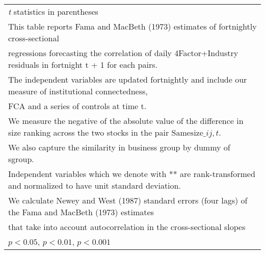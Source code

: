 {\begin{tabular}{l*{7}{c}}
\hline\hline
\multicolumn{8}{l}{\footnotesize \textit{t} statistics in parentheses}\\
\multicolumn{8}{l}{\footnotesize This table reports Fama and MacBeth (1973) estimates of fortnightly cross-sectional}\\
\multicolumn{8}{l}{\footnotesize  regressions forecasting the correlation of daily 4Factor+Industry residuals in fortnight t + 1 for each pairs.}\\
\multicolumn{8}{l}{\footnotesize The independent variables are updated fortnightly and include our measure of institutional connectedness,}\\
\multicolumn{8}{l}{\footnotesize  FCA and a series of controls at time t.}\\
\multicolumn{8}{l}{\footnotesize We measure the negative of the absolute value of the difference in size ranking across the two stocks in the pair $ \text{Samesize}\_{ij,t} $.}\\
\multicolumn{8}{l}{\footnotesize We also capture the similarity in business group by dummy of sgroup.}\\
\multicolumn{8}{l}{\footnotesize Independent variables which  we denote with ** are rank-transformed and normalized to have unit standard deviation.}\\
\multicolumn{8}{l}{\footnotesize  We calculate Newey and West (1987) standard errors (four lags) of the Fama and MacBeth (1973) estimates }\\
\multicolumn{8}{l}{\footnotesize  that take into account autocorrelation in the cross-sectional slopes}\\
\multicolumn{8}{l}{\footnotesize \sym{*} \(p<0.05\), \sym{**} \(p<0.01\), \sym{***} \(p<0.001\)}\\
\end{tabular}
}
